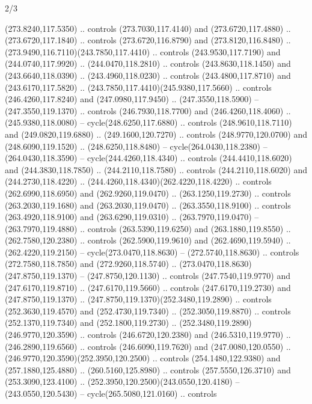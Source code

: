 \begin{flagdescription}{2/3}
\begin{scope}[xshift=0.5\flaglength,yshift=0.5\flagwidth,scale=\flagwidth/259.2]
\begin{scope}[y=0.8pt, x=0.8pt, yscale=-1,shift={(-243,-162)}]
      (273.8240,117.5350) .. controls (273.7030,117.4140) and (273.6720,117.4880) ..
      (273.6720,117.1840) .. controls (273.6720,116.8790) and (273.8120,116.8480) ..
      (273.9490,116.7110)(243.7850,117.4410) .. controls (243.9530,117.7190) and
      (244.0740,117.9920) .. (244.0470,118.2810) .. controls (243.8630,118.1450) and
      (243.6640,118.0390) .. (243.4960,118.0230) .. controls (243.4800,117.8710) and
      (243.6170,117.5820) .. (243.7850,117.4410)(245.9380,117.5660) .. controls
      (246.4260,117.8240) and (247.0980,117.9450) .. (247.3550,118.5900) --
      (247.3550,119.1370) .. controls (246.7930,118.7700) and (246.4260,118.4060) ..
      (245.9380,118.0080) -- cycle(248.6250,117.6880) .. controls
      (248.9610,118.7110) and (249.0820,119.6880) .. (249.1600,120.7270) .. controls
      (248.9770,120.0700) and (248.6090,119.1520) .. (248.6250,118.8480) --
      cycle(264.0430,118.2380) -- (264.0430,118.3590) -- cycle(244.4260,118.4340) ..
      controls (244.4410,118.6020) and (244.3830,118.7850) .. (244.2110,118.7580) ..
      controls (244.2110,118.6020) and (244.2730,118.4220) ..
      (244.4260,118.4340)(262.4220,118.4220) .. controls (262.6990,118.6950) and
      (262.9260,119.0470) .. (263.1250,119.2730) .. controls (263.2030,119.1680) and
      (263.2030,119.0470) .. (263.3550,118.9100) .. controls (263.4920,118.9100) and
      (263.6290,119.0310) .. (263.7970,119.0470) -- (263.7970,119.4880) .. controls
      (263.5390,119.6250) and (263.1880,119.8550) .. (262.7580,120.2380) .. controls
      (262.5900,119.9610) and (262.4690,119.5940) .. (262.4220,119.2150) --
      cycle(273.0470,118.8630) -- (272.5740,118.8630) .. controls
      (272.7580,118.7850) and (272.9260,118.5740) ..
      (273.0470,118.8630)(247.8750,119.1370) -- (247.8750,120.1130) .. controls
      (247.7540,119.9770) and (247.6170,119.8710) .. (247.6170,119.5660) .. controls
      (247.6170,119.2730) and (247.8750,119.1370) ..
      (247.8750,119.1370)(252.3480,119.2890) .. controls (252.3630,119.4570) and
      (252.4730,119.7340) .. (252.3050,119.8870) .. controls (252.1370,119.7340) and
      (252.1800,119.2730) .. (252.3480,119.2890)(246.9770,120.3590) .. controls
      (246.6720,120.2380) and (246.5310,119.9770) .. (246.2890,119.6560) .. controls
      (246.6090,119.7620) and (247.0080,120.0550) ..
      (246.9770,120.3590)(252.3950,120.2500) .. controls (254.1480,122.9380) and
      (257.1880,125.4880) .. (260.5160,125.8980) .. controls (257.5550,126.3710) and
      (253.3090,123.4100) .. (252.3950,120.2500)(243.0550,120.4180) --
      (243.0550,120.5430) -- cycle(265.5080,121.0160) .. controls

\end{scope}
\end{scope}
\end{flagdescription}
